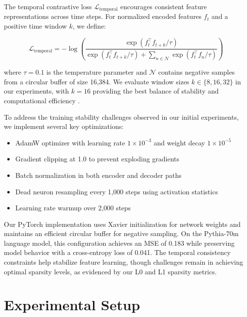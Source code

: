 \documentclass{article} %
\begin{document}
The temporal contrastive loss $\mathcal{L}_{\text{temporal}}$ encourages consistent feature representations across time steps. For normalized encoded features $f_t$ and a positive time window $k$, we define:

\begin{equation}
    \mathcal{L}_{\text{temporal}} = -\log\left(\frac{\exp(f_t^\top f_{t+k}/\tau)}{\exp(f_t^\top f_{t+k}/\tau) + \sum_{n \in \mathcal{N}} \exp(f_t^\top f_n/\tau)}\right)
\end{equation}

where $\tau=0.1$ is the temperature parameter and $\mathcal{N}$ contains negative samples from a circular buffer of size 16,384. We evaluate window sizes $k \in \{8, 16, 32\}$ in our experiments, with $k=16$ providing the best balance of stability and computational efficiency \cite{karpathy2023nanogpt}.

To address the training stability challenges observed in our initial experiments, we implement several key optimizations:
\begin{itemize}
    \item AdamW optimizer \cite{loshchilov2017adamw} with learning rate $1\times10^{-3}$ and weight decay $1\times10^{-5}$
    \item Gradient clipping at 1.0 to prevent exploding gradients
    \item Batch normalization in both encoder and decoder paths
    \item Dead neuron resampling every 1,000 steps using activation statistics
    \item Learning rate warmup over 2,000 steps
\end{itemize}

Our PyTorch \cite{paszke2019pytorch} implementation uses Xavier initialization for network weights and maintains an efficient circular buffer for negative sampling. On the Pythia-70m language model, this configuration achieves an MSE of 0.183 while preserving model behavior with a cross-entropy loss of 0.041. The temporal consistency constraints help stabilize feature learning, though challenges remain in achieving optimal sparsity levels, as evidenced by our L0 and L1 sparsity metrics.

\section{Experimental Setup}
\label{sec:experimental}
\end{document}
